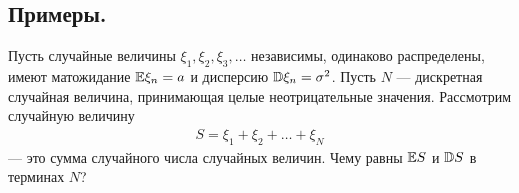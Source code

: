 \documentclass[../main.tex]{subfiles}
\begin{document}
\subsection{Примеры.}

\begin{exmpl}
 Пусть случайные величины $ \xi_1, \xi_2, \xi_3, \ldots $ независимы, одинаково распределены, имеют матожидание $ \mathbb E\xi_n = a $ и дисперсию $ \mathbb D\xi_n = \sigma^{2} $. Пусть $ N $ --- дискретная случайная величина, принимающая целые неотрицательные значения. Рассмотрим случайную величину
 \begin{align*}
  S = \xi_1  + \xi_2 + \ldots + \xi_N
 \end{align*} --- это сумма случайного числа случайных величин. Чему равны $ \mathbb E S $ и $ \mathbb D S $ в терминах $ N $?


\end{exmpl}
\end{document}

